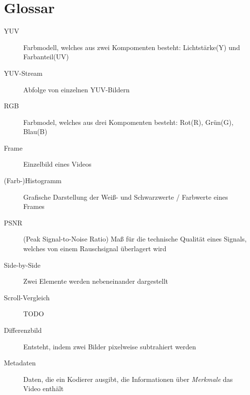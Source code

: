 \section{Glossar}

\begin{description}
	\item[YUV] Farbmodell, welches aus zwei Kompomenten besteht: Lichtstärke(Y) und Farbanteil(UV)
	\item[YUV-Stream] Abfolge von einzelnen YUV-Bildern
	\item[RGB] Farbmodel, welches aus drei Kompomenten besteht: Rot(R), Grün(G), Blau(B)
	\item[Frame] Einzelbild eines Videos
	\item[(Farb-)Histogramm] Grafische Darstellung der Weiß- und Schwarzwerte / Farbwerte eines Frames
	\item[PSNR](Peak Signal-to-Noise Ratio) Maß für die technische Qualität eines Signals, welches von einem Rauschsignal überlagert wird
	\item[\glqq Side-by-Side\grqq] Zwei Elemente werden nebeneinander dargestellt
	\item[\glqq Scroll-\grqq Vergleich] TODO
	\item[Differenzbild] Entsteht, indem zwei Bilder pixelweise subtrahiert werden
	\item[Metadaten] Daten, die ein Kodierer ausgibt, die Informationen über \emph{Merkmale} das Video enthält
\end{description}